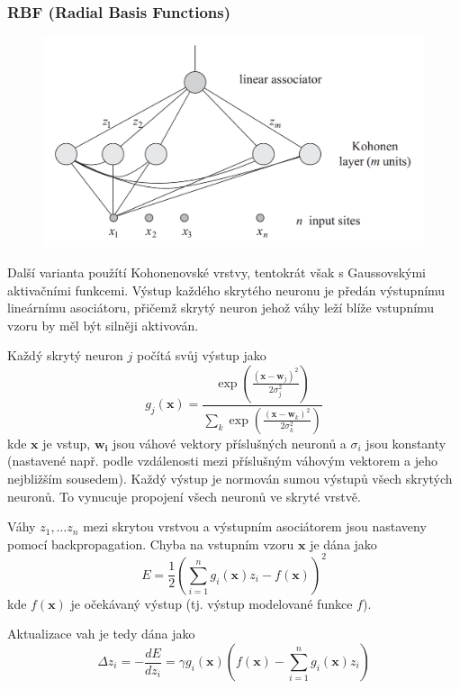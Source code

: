 \documentclass[11pt]{report} %
\renewcommand{\vec}[1]{\mathbf{#1}}
\numberwithin{equation}{section}
\begin{document}
\subsubsection{RBF (Radial Basis Functions)}
\begin{figure}[H]
	\centering
	\includegraphics[scale=0.7]{img/rbf_1.png}
\end{figure}
Další varianta použítí Kohonenovské vrstvy, tentokrát však s Gaussovskými aktivačními funkcemi. Výstup každého skrytého neuronu je předán výstupnímu lineárnímu asociátoru, přičemž skrytý neuron jehož váhy leží blíže vstupnímu vzoru by měl být silněji aktivován.

Každý skrytý neuron $j$ počítá svůj výstup jako
$$g_j(\vec{x}) = \frac{\exp\left(\frac{(\vec{x} - \vec{w}_j)^2}{2\sigma_j^2} \right)}{\sum\limits_k \exp\left(\frac{(\vec{x} - \vec{w}_k)^2}{2\sigma_k^2} \right)}$$
kde $\vec{x}$ je vstup, $\vec{w_i}$ jsou váhové vektory příslušných neuronů a $\sigma_i$ jsou konstanty (nastavené např. podle vzdálenosti mezi příslušným váhovým vektorem a jeho nejbližším sousedem). Každý výstup je normován sumou výstupů všech skrytých neuronů. To vynucuje propojení všech neuronů ve skryté vrstvě.

Váhy $z_1, \dots z_n$ mezi skrytou vrstvou a výstupním asociátorem jsou nastaveny pomocí backpropagation. Chyba na vstupním vzoru $\vec{x}$ je dána jako
$$E = \frac{1}{2}\left(\sum_{i=1}^{n} g_i(\vec{x})z_i - f(\vec{x})\right)^2$$
kde $f(\vec{x})$ je očekávaný výstup (tj. výstup modelované funkce $f$).

Aktualizace vah je tedy dána jako
$$\Delta z_i = -\frac{dE}{dz_i} = \gamma g_i(\vec{x})\left(f(\vec{x}) - \sum_{i=1}^{n} g_i(\vec{x})z_i \right)$$
\end{document}

